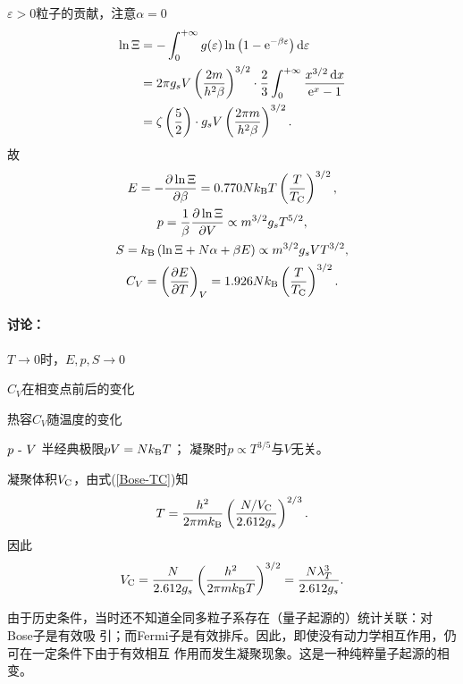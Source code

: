 $\varepsilon>0$粒子的贡献，注意$\alpha=0$
\begin{align}\notag
	\ln\Xi&=-\int\zti g(\varepsilon)\ln\kh{1-\e{-\beta\varepsilon}}\d\varepsilon\\\notag
	&=2\pi g_sV\kh{\frac{2m}{h^2\beta}}^{3/2}\cdot\frac23\int\zti\frac{x^{3/2}\d x}{\e x-1}\\
	&=\zeta\kh{\frac52}\cdot g_sV\kh{\frac{2\pi m}{h^2\beta}}^{3/2}.%
\end{align}
故
\begin{gather}
	E=-\pv{\ln\Xi}\beta=0.770N\kB T\kh{\frac T{T_\crt}}^{3/2},\\
	p=\frac1\beta\pv{\ln\Xi}V\propto m^{3/2}g_sT^{5/2},\\
	S=\kB\kh{\ln\Xi+N\alpha+\beta E}\propto m^{3/2}g_sVT^{3/2},\\
	C_V=\kh{\pv ET}_V=1.926N\kB\kh{\frac T{T_\crt}}^{3/2}.
\end{gather}
\paragraph*{讨论：}
\begin{compactenum}
	\item $T\to 0$时，$E,p,S\to0$
	\item $C_V$在相变点前后的变化
	\begin{center}
		\tikzchap 热容$C_V$随温度的变化
	\end{center}
	\item $p~\text{-}~  V$
		\subitem 半经典极限$pV=Nk_{\mathrm B} T$；
		\subitem 凝聚时$p\propto T^{3/5}$与$V$无关。
	\item 凝聚体积$V_\mathrm C$，由式(\ref{Bose-TC})知
	\[
	T=\frac{h^2}{2\pi mk_{\mathrm B}}\left(\frac{N/V_\mathrm C}{2.612g_s}\right)^{2/3}.
\]
	因此 
	\begin{align}
		V_\mathrm C=\frac{N}{2.612g_s}\left(\frac{h^2}{2\pi mk_{\mathrm B} T}\right)^{3/2}=\frac{N\lambda_T^3}{2.612g_s}.
	\end{align}
\end{compactenum}
由于历史条件，当时还不知道全同多粒子系存在（量子起源的）统计关联：对Bose子是有效吸
引；而Fermi子是有效排斥。因此，即使没有动力学相互作用，仍可在一定条件下由于有效相互
作用而发生凝聚现象。这是一种纯粹量子起源的相变。

